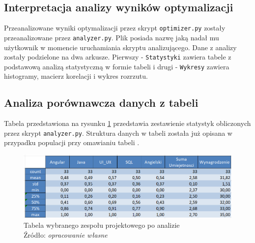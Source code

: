     \subsection{Interpretacja analizy wyników optymalizacji}\label{subsec:analiza_optimal}
    \par Przeanalizowane wyniki optymalizacji przez skrypt \verb|optimizer.py| zostały przeanalizowane przez \verb|analyzer.py|. Plik posiada nazwę jaką nadał mu użytkownik w momencie uruchamiania skryptu analizującego. Dane z analizy zostały podzielone na dwa arkusze. Pierwszy - \verb|Statystyki| zawiera tabele z podstawową analizą statystyczną w formie tabeli i drugi - \verb|Wykresy| zawiera histogramy, macierz korelacji i wykres rozrzutu.

    \subsection{Analiza porównawcza danych z tabeli}
    \par Tabela przedstawiona na rysunku \ref{fig:tabela_analiza_wybrani} przedstawia zestawienie statystyk obliczonych przez skrypt \verb|analyzer.py|. Struktura danych w tabeli została już opisana w przypadku populacji przy omawianiu tabeli .

    \begin{figure}[H]
        \centering
        \includegraphics[width=\linewidth]{chapters/Images/analiza_tabela_wybrani.png}
        \cprotect\caption{Tabela wybranego zespołu projektowego po analizie\\ Źródło:\textit{ opracowanie własne}}
        \label{fig:tabela_analiza_wybrani}
    \end{figure}

